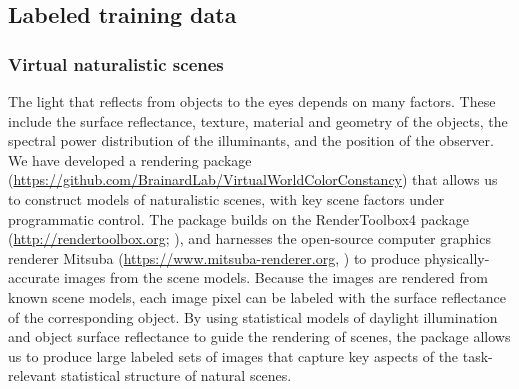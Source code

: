 \documentclass{jov}
\begin{document}
\subsection{Labeled training data} \label{method:VirtualWorld}
\subsubsection{Virtual naturalistic scenes}
The light that reflects from objects to the eyes depends on many factors.
These include the surface reflectance, texture, material and geometry of the objects, 
the spectral power distribution of the illuminants, and the position of the observer.
We have developed a rendering package 
(\href{https://github.com/BrainardLab/VirtualWorldColorConstancy}{https://github.com/BrainardLab/VirtualWorldColorConstancy}) 
that allows us to construct models of naturalistic scenes, with key scene factors under programmatic control.
The package builds on the RenderToolbox4 package (\href{http://rendertoolbox.org}{http://rendertoolbox.org}; ),
and harnesses the open-source computer graphics renderer Mitsuba (\href{https://www.mitsuba-renderer.org}{https://www.mitsuba-renderer.org}, 
) to produce physically-accurate images from the scene models.
Because the images are rendered from known scene models, each image pixel can be labeled with 
the surface reflectance of the corresponding object.
By using statistical models of daylight illumination and object surface reflectance to guide the rendering of scenes, 
the package allows us to produce large labeled sets of images that capture key aspects of the task-relevant 
statistical structure of natural scenes.
\end{document}

